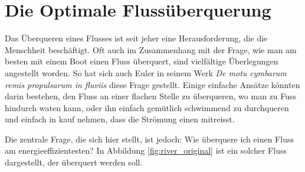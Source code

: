 \chapter{Die Optimale Flussüberquerung\label{chapter:schwimmen}}
\begin{refsection}


Das Überqueren eines Flusses ist seit jeher eine Herausforderung, die die Menschheit beschäftigt. Oft auch im Zusammenhang mit der Frage, wie man am besten mit einem Boot einen Fluss überquert, sind vielfältige Überlegungen angestellt worden. So hat sich auch Euler in seinem Werk \textit{De motu cymbarum remis propulsarum in fluviis} \cite{schwimmen:Euler_works} diese Frage gestellt. Einige einfache Ansätze könnten darin bestehen, den Fluss an einer flachen Stelle zu überqueren, wo man zu Fuss hindurch waten kann, oder ihn einfach gemütlich schwimmend zu durchqueren und einfach in kauf nehmen, dass die Strömung einen mitreisst.
	
	
Die zentrale Frage, die sich hier stellt, ist jedoch: Wie überquere ich einen Fluss am energieeffizientesten? In Abbildung \ref{fig:river_original} ist ein solcher Fluss dargestellt, der überquert werden soll.




\begin{figure}
    \centering

    \begin{tikzpicture}[x=0.75pt,y=0.75pt,yscale=-1,xscale=1]


\end{tikzpicture}
\end{figure}
\end{refsection}
